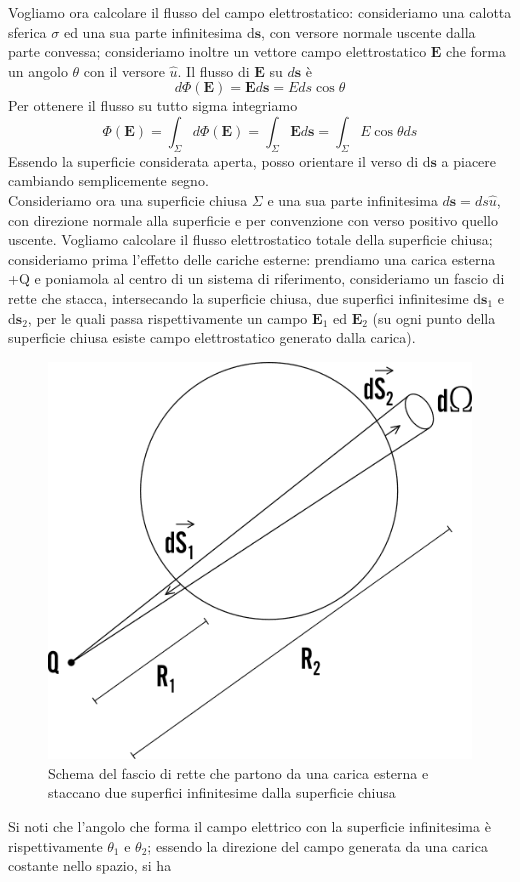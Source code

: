 \documentclass[
10pt, %
a4paper, %
oneside, %
headinclude,footinclude, %
BCOR5mm, %
]{scrartcl}
\begin{document}
Vogliamo ora calcolare il flusso del campo elettrostatico: consideriamo una calotta sferica \(\sigma\) ed una sua parte infinitesima d$\mathbf{s}$, con versore normale uscente dalla parte convessa; consideriamo inoltre un vettore campo elettrostatico $\mathbf{E}$ che forma un angolo \(\theta\) con il versore $\hat{u}$. Il flusso di $\mathbf{E}$ su \(d\mathbf{s}\) è 
\[d\Phi(\mathbf{E}) = \mathbf{E}d\mathbf{s} = Eds\cos\theta\]
Per ottenere il flusso su tutto sigma integriamo 
\[\Phi(\mathbf{E}) = \int_{\Sigma}d\Phi(\mathbf{E}) = \int_{\Sigma}\mathbf{E}d\mathbf{s} = \int_{\Sigma}E\cos\theta ds\]
Essendo la superficie considerata aperta, posso orientare il verso di d$\mathbf{s}$ a piacere cambiando semplicemente segno.\\
Consideriamo ora una superficie chiusa $\Sigma$ e una sua parte infinitesima $d\mathbf{s} = ds \hat{u}$, con direzione normale alla superficie e per convenzione con verso positivo quello uscente. Vogliamo calcolare il flusso elettrostatico totale della superficie chiusa; consideriamo prima l'effetto delle cariche esterne: prendiamo una carica esterna +Q e poniamola al centro di un sistema di riferimento, consideriamo un fascio di rette che stacca, intersecando la superficie chiusa, due superfici infinitesime d$\mathbf{s}_1$ e d$\mathbf{s}_2$, per le quali passa rispettivamente un campo $\mathbf{E}_1$ ed $\mathbf{E}_2$ (su ogni punto della superficie chiusa esiste campo elettrostatico generato dalla carica).  
\begin{figure}[h!]
	\centering
	\includegraphics[width=0.5\linewidth]{../images/thm_gauss_1}
	\caption{Schema del fascio di rette che partono da una carica esterna e staccano due superfici infinitesime dalla superficie chiusa}
	\label{fig:thmgauss1}
\end{figure}
\FloatBarrier
Si noti che l'angolo che forma il campo elettrico con la superficie infinitesima è rispettivamente \(\theta_1\) e \(\theta_2\); essendo la direzione del campo generata da una carica costante nello spazio, si ha
\end{document}
